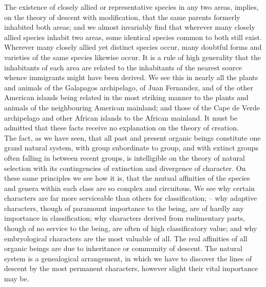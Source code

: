 \indent The existence of closely allied or representative species in any two areas, implies, on the theory of descent with modification, that the same parents formerly inhabited both areas; and we almost invariably find that wherever many closely allied species inhabit two areas, some identical species common to both still exist. Wherever many closely allied yet distinct species occur, many doubtful forms and varieties of the same species likewise occur. It is a rule of high generality that the inhabitants of each area are related to the inhabitants of the nearest source whence immigrants might have been derived. We see this in nearly all the plants and animals of the Galapagos archipelago, of Juan Fernandez, and of the other American islands being related in the most striking manner to the plants and animals of the neighbouring American mainland; and those of the Cape de Verde archipelago and other African islands to the African mainland. It must be admitted that these facts receive no explanation on the theory of creation.~\\
\indent The fact, as we have seen, that all past and present organic beings constitute one grand natural system, with group subordinate to group, and with extinct groups often falling in between recent groups, is intelligible on the theory of natural selection with its contingencies of extinction and divergence of character. On these same principles we see how it is, that the mutual affinities of the species and genera within each class are so complex and circuitous. We see why certain characters are far more serviceable than others for classification; -- why adaptive characters, though of paramount importance to the being, are of hardly any importance in classification; why characters derived from rudimentary parts, though of no service to the being, are often of high classificatory value; and why embryological characters are the most valuable of all. The real affinities of all organic beings are due to inheritance or community of descent. The natural system is a genealogical arrangement, in which we have to discover the lines of descent by the most permanent characters, however slight their vital importance may be.~\\
